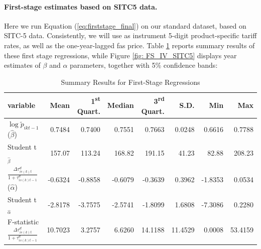 \documentclass[a4paper,11pt]{article}
\begin{document}
\paragraph{First-stage estimates based on SITC5 data.}

Here we run Equation (\ref{eq:firststage_final}) on our standard dataset, based on SITC-5 data. Consistently, we will use as instrument 5-digit product-specific tariff rates, as well as the one-year-lagged fas price. Table \ref{tab: FS_sitc5} reports summary results of these first stage regressions, while Figure \ref{fig: FS_IV_SITC5} displays year estimates of $\beta$ and $\alpha$ parameters, together with 5\% confidence bands:


\begin{table}[htbp]\centering
\caption{Summary Results for First-Stage Regressions\label{tab: FS_sitc5}}
\begin{tabular} {@{} l r r r r r r r @{}} \\ \hline
\textbf{variable } & \textbf{Mean} & \textbf{1\textsuperscript{st} Quart.} & \textbf{Median} & \textbf{3\textsuperscript{rd} Quart.} & \textbf{ S.D.} & \textbf{Min} & \textbf{Max} \\
\hline
 $\log \widetilde{p}_{ikt-1}$ ($\widehat{\beta}$)&     0.7484 &     0.7400 &     0.7551 &     0.7663 &     0.0248 &     0.6616 &     0.7788 \\
Student t$_{\widehat{\beta}}$  &   157.07 &   113.24 &   168.82 &   191.15 &    41.23 &    82.88 &   208.23 \\
$\frac{\Delta \tau^d_{is(k)t}}{1+\tau_{is(k)t-1}^d}$ ($\widehat{\alpha}$)  &    -0.6324 &    -0.8858 &    -0.6079 &    -0.3639 &     0.3962 &    -1.8353 &     0.0534 \\
 Student t$_{\widehat{\alpha}}$  &    -2.8178 &    -3.7575 &    -2.5741 &    -1.8099 &     1.6808 &    -7.3086 &     0.2280 \\
  F-statistic $\frac{\Delta \tau^d_{is(k)t}}{1+\tau_{is(k)t-1}^d}$  &    10.7023 &     3.2757 &     6.6260 &    14.1188 &    11.4529 &     0.0008 &    53.4159 \\
\hline
\end{tabular}
\end{table}
\end{document}
